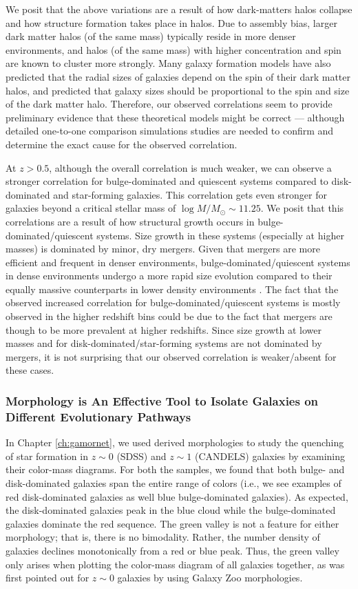 We posit that the above variations are a result of how dark-matters halos collapse and how structure formation takes place in halos. Due to assembly bias, larger dark matter halos (of the same mass) typically reside in more denser environments, and  halos (of the same mass) with higher concentration and spin are known to cluster more strongly. Many galaxy formation models have also predicted that the radial sizes of galaxies depend on the spin of their dark matter halos, and predicted that galaxy sizes should be proportional to the spin and size of the dark matter halo. Therefore, our observed correlations seem to provide preliminary evidence that these theoretical models might be correct --- although detailed one-to-one comparison simulations studies are needed to confirm and determine the exact cause for the observed correlation.

At $z > 0.5$, although the overall correlation is much weaker, we can observe a stronger correlation for bulge-dominated and quiescent systems compared to disk-dominated and star-forming galaxies. This correlation gets even stronger for galaxies beyond a critical stellar mass of $\log M/M_{\odot} \sim 11.25$. We posit that this correlations are a result of how structural growth occurs in bulge-dominated/quiescent systems. Size growth in these systems (especially at higher masses) is dominated by minor, dry mergers. Given that mergers are more efficient and frequent in denser environments, bulge-dominated/quiescent systems in dense environments undergo a more rapid size evolution compared to their equally massive counterparts in lower density environments . The fact that the observed increased correlation for bulge-dominated/quiescent systems is mostly observed in the higher redshift bins could be due to the fact that mergers are though to be more prevalent at higher redshifts. Since size growth at lower masses and for disk-dominated/star-forming systems are not dominated by mergers, it is not surprising that our observed correlation is weaker/absent for these cases. 

\subsubsection{Morphology is An Effective Tool to Isolate Galaxies on Different Evolutionary Pathways} \label{sec_conc:color_mass}

In Chapter \ref{ch:gamornet}, we used \gamornet{} derived morphologies to study the quenching of star formation in  $z\sim0$ (SDSS) and $z\sim1$ (CANDELS) galaxies by examining their color-mass diagrams. For both the samples, we found that both bulge- and disk-dominated galaxies span the entire range of colors (i.e., we see examples of red disk-dominated galaxies as well blue bulge-dominated galaxies). As expected, the disk-dominated galaxies peak in the blue cloud while the bulge-dominated galaxies dominate the red sequence. The green valley is not a feature for either morphology; that is, there is no bimodality. Rather, the number density of galaxies declines monotonically from a red or blue peak. Thus, the green valley only arises when plotting the color-mass diagram of all galaxies together, as was first pointed out for $z\sim0$ galaxies by using Galaxy Zoo morphologies. 

